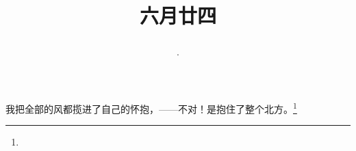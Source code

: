\title{\date[d=29,m=7,y=2024][year:cn-y,年,month:cn,day:cn,日,·,weekday]·六月廿四 }
我把全部的风都揽进了自己的怀抱，——不对！是抱住了整个北方。\footnote{ }

